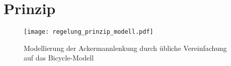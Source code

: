 \section{Prinzip}

\begin{figure}[H] %
  \centering
  \texttt{[image: regelung\_prinzip\_modell.pdf]}
  \caption{Modellierung der Ackermannlenkung durch übliche Vereinfachung auf das Bicycle-Modell}
  \label{fig:regelung_prinzip_modell}
\end{figure}
